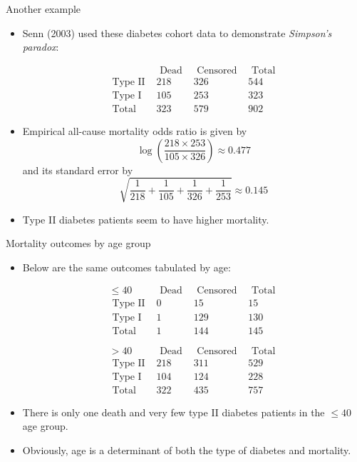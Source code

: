 \documentclass[10pt]{beamer}\usepackage[]{graphicx}\usepackage[]{color}
\begin{document}
\begin{frame}{Another example}
	\begin{itemize}
		\item Senn (2003) used these diabetes cohort data to
		demonstrate \textit{Simpson's paradox}:
		
		$$
		\begin{array}{lccc} 
			& \text { Dead } & \text { Censored } & \text { Total } \\
			\text { Type II } & 218 & 326 & 544 \\
			\text { Type I } & 105 & 253 & 323 \\
			\text { Total } & 323 & 579 & 902
		\end{array}
		$$
		
		\item Empirical all-cause mortality odds ratio is given by
		$$
		\log \left(\frac{218 \times 253}{105 \times 326}\right) \approx 0.477
		$$
		and its standard error by
		$$
		\sqrt{\frac{1}{218}+\frac{1}{105}+\frac{1}{326}+\frac{1}{253}} \approx 0.145
		$$
		\item Type II diabetes patients seem to have higher mortality.
	
	
	\end{itemize}
\end{frame}



\begin{frame}{Mortality outcomes by age group}
	\begin{itemize}
		\item Below are the same outcomes tabulated by age:
		
		$$
		\begin{array}{lccc}
		\leq 40 & \text { Dead } & \text { Censored } & \text { Total } \\
		\text { Type II } & 0 & 15 & 15 \\
		\text { Type I } & 1 & 129 & 130 \\
		\text { Total } & 1 & 144 & 145 \\
		& & & \\
		& & & \\
		>40 & \text { Dead } & \text { Censored } & \text { Total } \\
		\text { Type II } & 218 & 311 & 529 \\
		\text { Type I } & 104 & 124 & 228 \\
		\text { Total } & 322 & 435 & 757
		\end{array}
		$$
		\item There is only one death and very few type II diabetes patients in the $\leq 40$ age group.
		\item Obviously, age is a determinant of both the type of diabetes and mortality.
	\end{itemize}
\end{frame}
\end{document}
